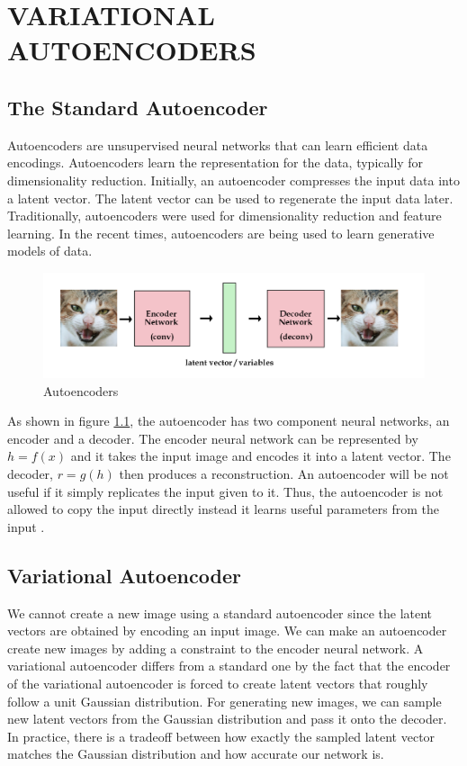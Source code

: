 \chapter{VARIATIONAL AUTOENCODERS}
\label{chapter:vae}
\begin{onehalfspacing}
    \section{The Standard Autoencoder}
    Autoencoders are unsupervised neural networks that can learn efficient 
    data encodings. Autoencoders learn the representation for the data, 
    typically for dimensionality reduction. Initially, an autoencoder 
    compresses the input data into a latent vector. The latent vector can be 
    used to regenerate the input data later. Traditionally, autoencoders were 
    used for dimensionality reduction and feature learning. In the recent times, 
    autoencoders are being used to learn generative models of data.

    \begin{figure}[h]
        \centering
        \includegraphics[width=0.8\linewidth]{images/autoencoders.png}
        \caption{Autoencoders \cite{autoencoders_kvfrans}}
        \label{fig:autoencoders}
    \end{figure} 

    As shown in figure \ref{fig:autoencoders}, the autoencoder has two 
    component neural networks, an encoder and a decoder. The encoder neural 
    network can be represented by $h = f(x)$ and it takes the input image and 
    encodes it into a latent vector. The decoder, $r = g(h)$ then produces a 
    reconstruction. An autoencoder will be not useful if it simply replicates 
    the input given to it. Thus, the autoencoder is not allowed to copy the 
    input directly instead it learns useful parameters from the 
    input \cite{dlbook}.

    \section{Variational Autoencoder}
    
    We cannot create a new image using a standard autoencoder since the 
    latent vectors are obtained by encoding an input image. We can make an 
    autoencoder create new images by adding a constraint to the encoder neural 
    network. A variational autoencoder differs from a standard one by the fact 
    that the encoder of the variational autoencoder is forced to create latent 
    vectors that roughly follow a unit Gaussian distribution. For generating 
    new images, we can sample new latent vectors from the Gaussian distribution 
    and pass it onto the decoder.
    In practice, there is a tradeoff between how exactly the sampled latent 
    vector matches the Gaussian distribution and how accurate our network is.


\end{onehalfspacing}
